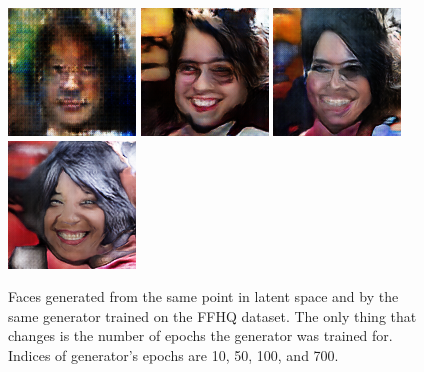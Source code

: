 \begin{figure}[!h]
    \centerline{
        \includegraphics[scale=0.8]{figures/ffhq/ffhq128x128_progress0010.png}
        \includegraphics[scale=0.8]{figures/ffhq/ffhq128x128_progress0050.png}
        \includegraphics[scale=0.8]{figures/ffhq/ffhq128x128_progress0100.png}
        \includegraphics[scale=0.8]{figures/ffhq/ffhq128x128_progress0700.png}
    }
    \caption{\label{fig:ffhq-progress}Faces generated from the same point in latent space and by the same generator trained on the FFHQ dataset. The only thing that changes is the number of epochs the generator was trained for. Indices of generator's epochs are 10, 50, 100, and 700.}
\end{figure}

